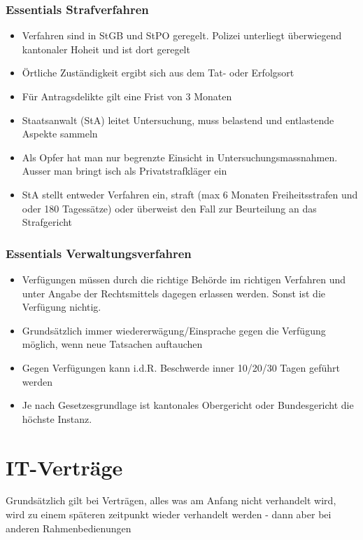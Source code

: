 \documentclass{report}
\theoremstyle{definition}
\theoremstyle{example}
\begin{document}
\subsection{Essentials Strafverfahren}
\begin{itemize}
   \item Verfahren sind in StGB und StPO geregelt. Polizei unterliegt überwiegend kantonaler Hoheit und ist dort geregelt
   \item Örtliche Zuständigkeit ergibt sich aus dem Tat- oder Erfolgsort
   \item Für Antragsdelikte gilt eine Frist von 3 Monaten
   \item Staatsanwalt (StA) leitet Untersuchung, muss belastend und entlastende Aspekte sammeln
   \item Als Opfer hat man nur begrenzte Einsicht in Untersuchungsmassnahmen. Ausser man bringt isch als Privatstrafkläger ein
   \item StA stellt entweder Verfahren ein, straft (max 6 Monaten Freiheitsstrafen und oder 180 Tagessätze) oder überweist den Fall zur Beurteilung an das Strafgericht
\end{itemize}

\subsection{Essentials Verwaltungsverfahren}
\begin{itemize}
   \item Verfügungen müssen durch die richtige Behörde im richtigen Verfahren und unter Angabe der Rechtsmittels dagegen erlassen werden. Sonst ist die Verfügung nichtig.
   \item Grundsätzlich immer wiedererwägung/Einsprache gegen die Verfügung möglich, wenn neue Tatsachen auftauchen
   \item Gegen Verfügungen kann i.d.R. Beschwerde inner 10/20/30 Tagen geführt werden
   \item Je nach Gesetzesgrundlage ist kantonales Obergericht oder Bundesgericht die höchste Instanz.
\end{itemize}




\chapter{IT-Verträge}
Grundsätzlich gilt bei Verträgen, alles was am Anfang nicht verhandelt wird, wird zu einem späteren zeitpunkt wieder verhandelt werden - dann aber bei anderen Rahmenbedienungen
\end{document}
